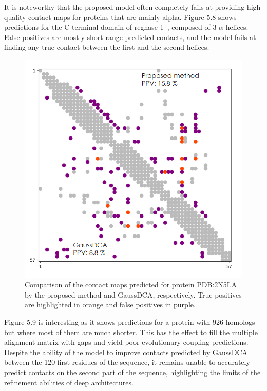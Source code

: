     It is noteworthy that the proposed model often completely fails at providing
    high-quality contact maps for proteins that are mainly alpha.
    Figure 5.8 shows predictions for the C-terminal domain of
    regnase-1~\cite{yokogawa2016structural}, composed of 3 $\alpha$-helices.
    False positives are mostly short-range predicted contacts, and the model fails at 
    finding any true contact between the first and the second helices.

    \begin{figure}[H]
        \begin{center}
            \includegraphics[width=\textwidth, keepaspectratio]{imgs/2N5LA.png}
            \caption{Comparison of the contact maps predicted for protein PDB:2N5LA
                by the proposed method and GaussDCA, respectively. True positives
                are highlighted in orange and false positives in purple.}
            \label{analysis_2N5LA}
        \end{center}
    \end{figure}

    Figure 5.9 is interesting as it shows predictions for a protein
    with 926 homologs but where most of them are much shorter. This has the effect
    to fill the multiple alignment matrix with gaps and yield poor
    evolutionary coupling predictions.
    Despite the ability of the model to improve contacts predicted by GaussDCA between the
    120 first residues of the sequence, it remains unable to accurately predict
    contacts on the second part of the sequence, highlighting the limits of the
    refinement abilities of deep architectures.


